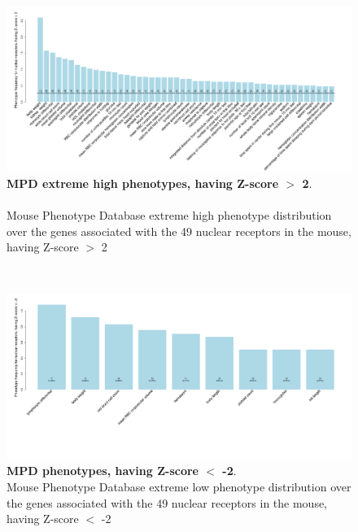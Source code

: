 \documentclass[fleqn,11pt]{SelfArx}
\begin{document}
\begin{figure}[H]
	\centering
	\includegraphics[width=\linewidth]{pics/mpi_phenotypes_distribution_zscore2.pdf}
	\captionsetup{margin=12pt,format=plain,font=footnotesize,labelfont=bf}
 	\caption{\footnotesize{\textbf{MPD extreme high phenotypes, having Z-score $>$ 2}. 
	~~~~~~~\\
	Mouse Phenotype Database extreme high phenotype distribution over the genes associated with the 49 nuclear receptors in the mouse, having Z-score $>$ 2}}
	\label{fig:mpi_pheotypes_distribution_zscore2}
\end{figure}
~~~~~~~\\
\begin{figure}[H]
	\centering
	\includegraphics[width=\linewidth]{pics/mpi_phenotypes_distribution_zscore2_neg.pdf}
	\captionsetup{margin=12pt,format=plain,font=footnotesize,labelfont=bf}
 	\caption{\footnotesize{\textbf{MPD phenotypes, having Z-score $<$ -2}. 
	~~~~~~~\\
	Mouse Phenotype Database extreme low phenotype distribution over the genes associated with the 49 nuclear receptors in the mouse, having Z-score $<$ -2}}
	\label{fig:mpi_pheotypes_distribution_zscore2_neg}
\end{figure}
~~~~~~~\\
\end{document}
